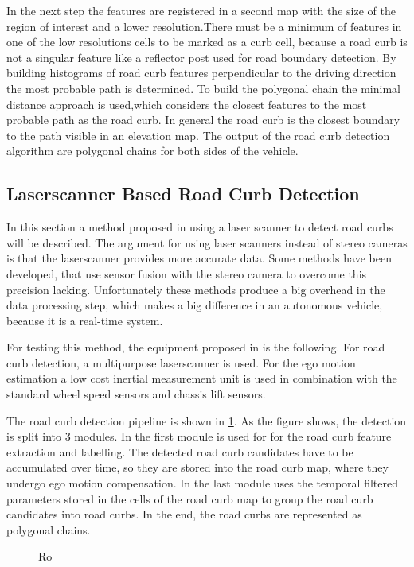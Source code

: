 \documentclass[conference]{IEEEtran}
\begin{document}
In the next step the features are registered in a second map with the size of the region of interest and a lower resolution.There must be a minimum of features in one of the low resolutions cells to be marked as a curb cell, because a road curb is not a singular feature like a reflector post used for road boundary detection. By building histograms of road curb features perpendicular to the driving direction the most probable path is determined. To build the polygonal chain the minimal distance approach is used,which considers the closest features to the most probable path as the road curb. In general the road curb is the closest boundary to the path visible in an elevation map. The output of the road curb detection algorithm are polygonal chains for both sides of the vehicle.


\subsection{Laserscanner Based Road Curb Detection}

In this section a method proposed in \cite{stereo} using a laser scanner to detect road curbs will be described. The argument for using laser scanners instead of stereo cameras is that the laserscanner provides more accurate data. Some methods have been developed, that use sensor fusion with the stereo camera to overcome this precision lacking. Unfortunately these methods produce a big overhead in the data processing step, which makes a big difference in an autonomous vehicle, because it is a real-time system.

For testing this method, the equipment proposed in \cite{stereo} is the following. For road curb detection, a multipurpose laserscanner is used. For the ego motion estimation a low cost inertial measurement unit is used in combination with the standard wheel speed sensors and chassis lift sensors. 

The road curb detection pipeline is shown in \ref{fig1}. As the figure shows, the detection is split into 3 modules. In the first module is used for for the road curb feature extraction and labelling. The detected road curb candidates have to be accumulated over time, so they are stored into the road curb map, where they undergo ego motion compensation. In the last module uses the temporal filtered parameters stored in the cells of the road curb map to group the road curb candidates into road curbs. In the end, the road curbs are represented as polygonal chains.  

\begin{figure}[ht]
	\centering
	\caption{Ro}
	\label{fig1}
\end{figure}
  
\end{document}
